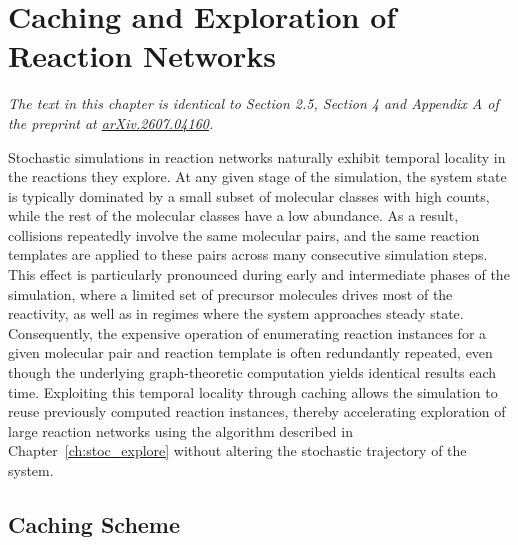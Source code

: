 \chapter[Caching of Reaction Networks]{Caching and Exploration of Reaction Networks}
\label{ch:cache_in_crns} %

{\sffamily\slshape The text in this chapter is identical to Section 2.5, Section 4 and Appendix A of the preprint at \href{https://arxiv.org/abs/2504.10609}{arXiv.2607.04160}.\\}

Stochastic simulations in reaction networks naturally exhibit temporal locality in the reactions they explore. At any given stage of the simulation, the system state is typically dominated by a small subset of molecular classes with high counts, while the rest of the molecular classes have a low abundance. As a result, collisions repeatedly involve the same molecular pairs, and the same reaction templates are applied to these pairs across many consecutive simulation steps. This effect is particularly pronounced during early and intermediate phases of the simulation, where a limited set of precursor molecules drives most of the reactivity, as well as in regimes where the system approaches steady state. Consequently, the expensive operation of enumerating reaction instances for a given molecular pair and reaction template is often redundantly repeated, even though the underlying graph-theoretic computation yields identical results each time. Exploiting this temporal locality through caching allows the simulation to reuse previously computed reaction instances, thereby accelerating exploration of large reaction networks using the algorithm described in Chapter~\ref{ch:stoc_explore} without altering the stochastic trajectory of the system.

\section{Caching Scheme}
\label{cacheScheme}

